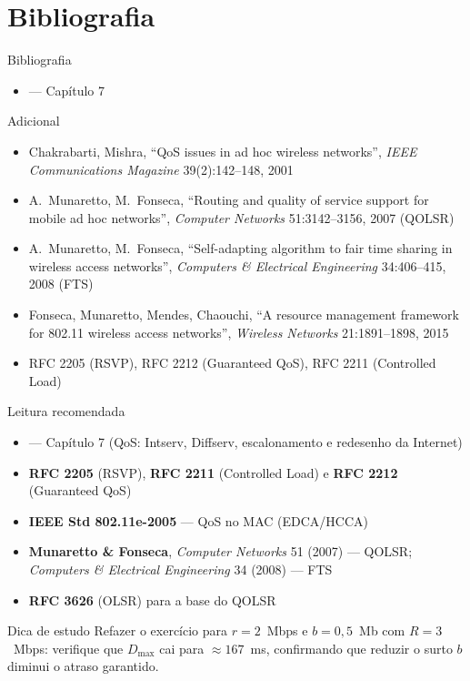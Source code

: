\documentclass[aspectratio=169,11pt]{beamer}
\begin{document}
\section{Bibliografia}

\begin{frame}{Bibliografia}
  \begin{itemize}
    \item \textbf{\kurose{}} --- Capítulo 7
  \end{itemize}
  \begin{block}{Adicional}
    \begin{itemize}
      \item Chakrabarti, Mishra, ``QoS issues in ad hoc wireless networks'', \emph{IEEE Communications Magazine} 39(2):142--148, 2001
      \item A.\ Munaretto, M.\ Fonseca, ``Routing and quality of service support for mobile ad hoc networks'', \emph{Computer Networks} 51:3142--3156, 2007 (QOLSR)
      \item A.\ Munaretto, M.\ Fonseca, ``Self-adapting algorithm to fair time sharing in wireless access networks'', \emph{Computers \& Electrical Engineering} 34:406--415, 2008 (FTS)
      \item Fonseca, Munaretto, Mendes, Chaouchi, ``A resource management framework for 802.11 wireless access networks'', \emph{Wireless Networks} 21:1891--1898, 2015
      \item RFC 2205 (RSVP), RFC 2212 (Guaranteed QoS), RFC 2211 (Controlled Load)
    \end{itemize}
  \end{block}
\end{frame}

\begin{frame}{Leitura recomendada}
  \begin{itemize}
    \item \textbf{\kurose{}} --- Capítulo 7 (QoS: Intserv, Diffserv, escalonamento e redesenho da Internet)
    \item \textbf{RFC 2205} (RSVP), \textbf{RFC 2211} (Controlled Load) e \textbf{RFC 2212} (Guaranteed QoS)
    \item \textbf{IEEE Std 802.11e-2005} --- QoS no MAC (EDCA/HCCA)
    \item \textbf{Munaretto \& Fonseca}, \emph{Computer Networks} 51 (2007) --- QOLSR; \emph{Computers \& Electrical Engineering} 34 (2008) --- FTS
    \item \textbf{RFC 3626} (OLSR) para a base do QOLSR
  \end{itemize}
  \begin{alertblock}{Dica de estudo}
    Refazer o exercício para $r=2$~Mbps e $b=0{,}5$~Mb com $R=3$~Mbps: verifique que $D_{\max}$ cai para $\approx 167$~ms, confirmando que reduzir o surto $b$ diminui o atraso garantido.
  \end{alertblock}
\end{frame}
\end{document}
